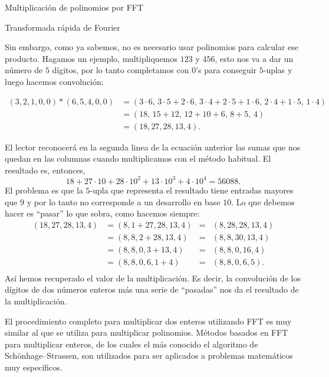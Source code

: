 \begin{chapter}{Multiplicación de polinomios por FFT}
\begin{section}{Transformada rápida de Fourier}
\begin{ejemplo*}
        Sin embargo, como ya sabemos, no es necesario usar polinomios para calcular ese producto. Hagamos un ejemplo, multipliquemos $123$ y $456$, esto nos va a dar un número de $5$ dígitos, por lo tanto completamos con $0$'s para conseguir $5$-uplas y luego hacemos convolución:
        \begin{small}
            \begin{align*}
                (3,2,1,0,0)*(6,5,4,0,0) & = (3\cdot 6,\, 3\cdot  5 + 2\cdot 6 ,\, 3\cdot 4 +  2\cdot 5+ 1\cdot 6,\, 2\cdot 4 + 1 \cdot 5,\,1 \cdot 4) \\
                                        & = (18,\, 15 + 12,\, 12 +10 +6,\, 8 +5,\, 4)                                                                 \\
                                        & = (18, 27, 28, 13, 4).
            \end{align*}
        \end{small}
        El lector reconocerá en la segunda linea de la ecuación anterior las sumas que nos quedan en las columnas cuando multiplicamos con el método habitual. El resultado es, entonces,
        \begin{equation*}
            18+ 27 \cdot 10 + 28 \cdot 10^2 +  13\cdot 10^3 + 4 \cdot 10^4 = 56088.
        \end{equation*}
        El problema es que la $5$-upla que representa el resultado tiene entradas mayores que $9$ y por lo tanto no corresponde a un desarrollo en base $10$. Lo  que debemos hacer es ``pasar'' lo que sobra, como hacemos siempre:
        \begin{align*}
            (18, 27, 28, 13, 4) & = (8,1 + 27, 28, 13, 4) &=& (8,28, 28, 13, 4) \\
                                & = (8,8, 2+28, 13, 4)  &=& (8,8, 30, 13, 4)    \\
                                & = (8,8, 0, 3+13, 4)  &=& (8,8, 0, 16, 4)     \\
                                & = (8,8, 0, 6, 1+4)   &=& (8,8, 0, 6, 5).    \\
        \end{align*}
        Así hemos recuperado el valor de la multiplicación. Es decir, la convolución de los dígitos de dos números enteros más una serie de ``pasadas'' nos da el resultado de la multiplicación.

        El procedimiento completo para multiplicar dos enteros utilizando FFT es muy similar al que se utiliza para multiplicar polinomios. Métodos basados en FFT para multiplicar enteros, de los cuales el más conocido el algoritmo de Schönhage–Strassen, son utilizados para ser aplicados a problemas matemáticos muy específicos.

    \end{ejemplo*}



 \end{section}


\end{chapter}

